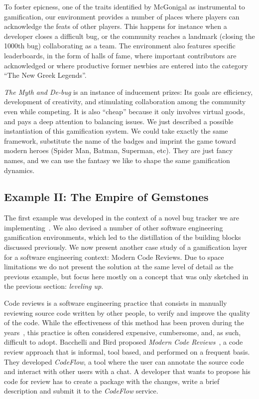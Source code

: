 To foster epicness, one of the traits identified by McGonigal as instrumental to gamification, our environment provides a number of places where players can acknowledge the feats of other players.
This happens for instance when a developer closes a difficult bug, or the community reaches a landmark (\eg closing the 1000th bug) collaborating as a team.
The environment also features specific leaderboards, in the form of halls of fame, where important contributors are acknowledged or where productive former newbies are entered into the category ``The New Greek Legends''.

\textit{The Myth and De-bug} is an instance of inducement prizes: Its goals are efficiency, development of creativity, and stimulating collaboration among the community even while competing.
It is also ``cheap'' because it only involves virtual goods, and pays a deep attention to balancing issues.
We just described a possible instantiation of this gamification system.
We could take exactly the same framework, substitute the name of the badges and imprint the game toward modern heroes (Spider Man, Batman, Superman, etc).
They are just fancy names, and we can use the fantasy we like to shape the same gamification dynamics.

\subsection{Example II: The Empire of Gemstones}\label{sec:gamification-example-gems}

The first example was developed in the context of a novel bug tracker we are implementing~\cite{DalS2014a}.
We also devised a number of other software engineering gamification environments, which led to the distillation of the building blocks discussed previously.
We now present another case study of a gamification layer for a software engineering context: Modern Code Reviews.
Due to space limitations we do not present the solution at the same level of detail as the previous example, but focus here mostly on a concept that was only sketched in the previous section: \emph{leveling up}.

Code reviews is a software engineering practice that consists in manually reviewing source code written by other people, to verify and improve the quality of the code.
While the effectiveness of this method has been proven during the years~\cite{Shull2008a}, this practice is often considered expensive, cumbersome, and, as such, difficult to adopt.
Bacchelli and Bird proposed \textit{Modern Code Reviews}~\cite{Bacc2013a}, a code review approach that is informal, tool based, and performed on a frequent basis.
They developed \textit{CodeFlow}, a tool where the user can annotate the source code and interact with other users with a chat.
A developer that wants to propose his code for review has to create a package with the changes, write a brief description and submit it to the \textit{CodeFlow} service.

